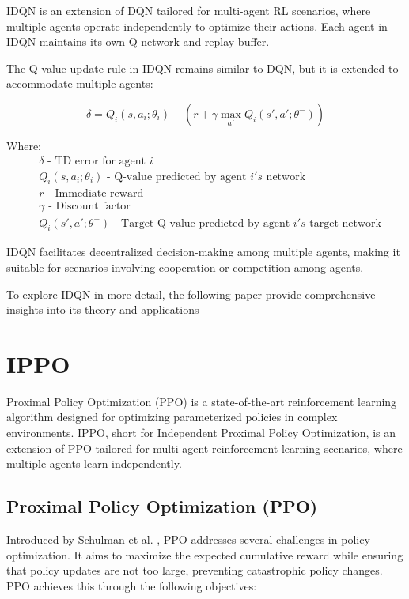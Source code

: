 IDQN is an extension of DQN tailored for multi-agent RL scenarios, where multiple agents operate independently to optimize their actions. Each agent in IDQN maintains its own Q-network and replay buffer.

The Q-value update rule in IDQN remains similar to DQN, but it is extended to accommodate multiple agents:

\[
\delta = Q_i(s, a_i;\theta_i) - (r + \gamma \max_{a'} Q_i(s', a';\theta^-))
\]

Where:
\begin{align*}
    &\delta \text{ - TD error for agent } i\\
    &Q_i(s, a_i;\theta_i) \text{ - Q-value predicted by agent } i's \text{ network}\\
    &r \text{ - Immediate reward}\\
    &\gamma \text{ - Discount factor}\\
    &Q_i(s', a';\theta^-) \text{ - Target Q-value predicted by agent } i's \text{ target network}
\end{align*}

IDQN facilitates decentralized decision-making among multiple agents, making it suitable for scenarios involving cooperation or competition among agents.


To explore IDQN in more detail, the following paper\cite{ault2020learning} provide comprehensive insights into its theory and applications

\section{IPPO}\label{sec:IPPO}
Proximal Policy Optimization (PPO) is a state-of-the-art reinforcement learning algorithm designed for optimizing parameterized policies in complex environments. IPPO, short for Independent Proximal Policy Optimization, is an extension of PPO tailored for multi-agent reinforcement learning scenarios, where multiple agents learn independently.

\subsection{Proximal Policy Optimization (PPO)}

Introduced by Schulman et al. \cite{schulman2017proximal}, PPO addresses several challenges in policy optimization. It aims to maximize the expected cumulative reward while ensuring that policy updates are not too large, preventing catastrophic policy changes. PPO achieves this through the following objectives:


